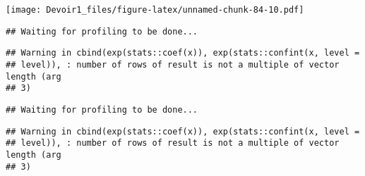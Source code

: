 \documentclass[]{article}
\newenvironment{Shaded}{\begin{snugshade}}{\end{snugshade}}
\newcommand{\KeywordTok}[1]{\textcolor[rgb]{0.13,0.29,0.53}{\textbf{#1}}}
\newcommand{\DataTypeTok}[1]{\textcolor[rgb]{0.13,0.29,0.53}{#1}}
\newcommand{\DecValTok}[1]{\textcolor[rgb]{0.00,0.00,0.81}{#1}}
\newcommand{\StringTok}[1]{\textcolor[rgb]{0.31,0.60,0.02}{#1}}
\newcommand{\OperatorTok}[1]{\textcolor[rgb]{0.81,0.36,0.00}{\textbf{#1}}}
\newcommand{\NormalTok}[1]{#1}
\begin{document}
\texttt{[image: Devoir1\_files/figure-latex/unnamed-chunk-84-10.pdf]}

\begin{Shaded}
\end{Shaded}

\begin{verbatim}
## Waiting for profiling to be done...
\end{verbatim}

\begin{verbatim}
## Warning in cbind(exp(stats::coef(x)), exp(stats::confint(x, level =
## level)), : number of rows of result is not a multiple of vector length (arg
## 3)
\end{verbatim}

\begin{verbatim}
## Waiting for profiling to be done...
\end{verbatim}

\begin{verbatim}
## Warning in cbind(exp(stats::coef(x)), exp(stats::confint(x, level =
## level)), : number of rows of result is not a multiple of vector length (arg
## 3)
\end{verbatim}
\end{document}
